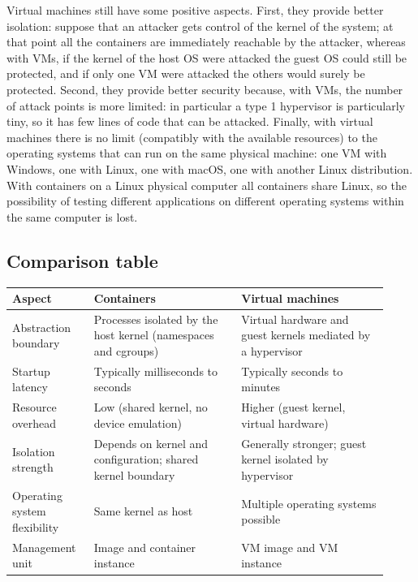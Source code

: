 Virtual machines still have some positive aspects. First, they provide better isolation: suppose that an attacker gets control of the kernel of the system; at that point all the containers are immediately reachable by the attacker, whereas with VMs, if the kernel of the host OS were attacked the guest OS could still be protected, and if only one VM were attacked the others would surely be protected. Second, they provide better security because, with VMs, the number of attack points is more limited: in particular a type 1 hypervisor is particularly tiny, so it has few lines of code that can be attacked. Finally, with virtual machines there is no limit (compatibly with the available resources) to the operating systems that can run on the same physical machine: one VM with Windows, one with Linux, one with macOS, one with another Linux distribution. With containers on a Linux physical computer all containers share Linux, so the possibility of testing different applications on different operating systems within the same computer is lost.

\subsection{Comparison table}

\begin{center}
\small
\begin{tabular}{@{}>{\raggedright\arraybackslash}p{0.2\linewidth}>{\raggedright\arraybackslash}p{0.36\linewidth}>{\raggedright\arraybackslash}p{0.36\linewidth}@{}}
\toprule
\textbf{Aspect} & \textbf{Containers} & \textbf{Virtual machines}\\
\midrule
Abstraction boundary & Processes isolated by the host kernel (namespaces and cgroups) & Virtual hardware and guest kernels mediated by a hypervisor\\
Startup latency & Typically milliseconds to seconds & Typically seconds to minutes\\
Resource overhead & Low (shared kernel, no device emulation) & Higher (guest kernel, virtual hardware)\\
Isolation strength & Depends on kernel and configuration; shared kernel boundary & Generally stronger; guest kernel isolated by hypervisor\\
Operating system flexibility & Same kernel as host & Multiple operating systems possible\\
Management unit & Image and container instance & VM image and VM instance\\
\bottomrule
\end{tabular}
\end{center}


